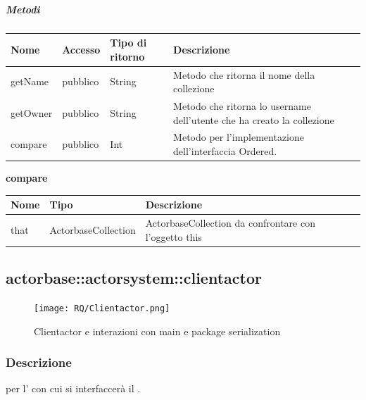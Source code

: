 \documentclass{scalatekids-article}
\begin{document}
\subparagraph{Metodi}
\begin{tabular}{| l | l | l | l |}
  \hline
  Nome & Accesso & Tipo di ritorno & Descrizione\\
  \hline
  getName & pubblico & String & Metodo che ritorna il nome della collezione \\
  \hline
  getOwner & pubblico & String & Metodo che ritorna lo username dell'utente che ha creato la collezione \\
  \hline
  compare & pubblico & Int & Metodo per l'implementazione dell'interfaccia Ordered.\\
  \hline
\end{tabular}

\begin{center}
  \textbf{compare}\\
\end{center}
\begin{tabular}{| l | l | l |}
  \hline
  Nome & Tipo & Descrizione\\
  \hline
  that & ActorbaseCollection & ActorbaseCollection da confrontare con l'oggetto this \\
  \hline
\end{tabular}



\subsection{actorbase::actorsystem::clientactor}
\label{sec:actorbase::actorsystem::clientactor}

\begin{figure}[H]
  \begin{center}
    \texttt{[image: RQ/Clientactor.png]}
    \caption{Clientactor e interazioni con main e package serialization}
  \end{center}
\end{figure}

\subsubsection{Descrizione}

 per l' con cui si interfaccerà il .
\end{document}

